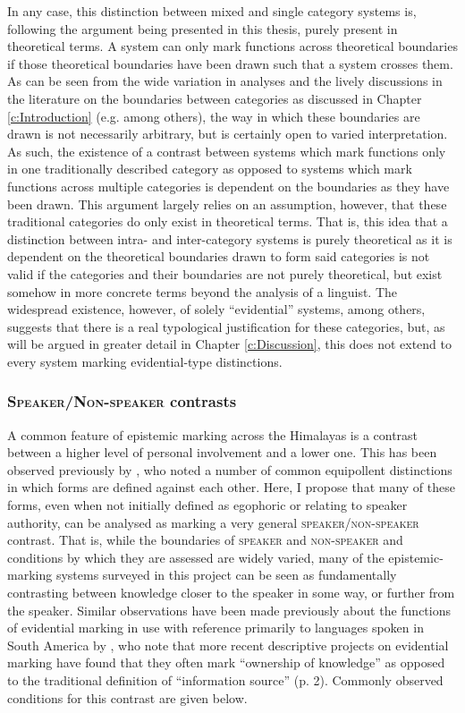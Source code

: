 In any case, this distinction between mixed and single category systems is, following the argument being presented in this thesis, purely present in theoretical terms. A system can only mark functions across theoretical boundaries if those theoretical boundaries have been drawn such that a system crosses them. As can be seen from the wide variation in analyses and the lively discussions in the literature on the boundaries between categories as discussed in Chapter \ref{c:Introduction} (e.g.  among others), the way in which these boundaries are drawn is not necessarily arbitrary, but is certainly open to varied interpretation. As such, the existence of a contrast between systems which mark functions only in one traditionally described category as opposed to systems which mark functions across multiple categories is dependent on the boundaries as they have been drawn. This argument largely relies on an assumption, however, that these traditional categories do only exist in theoretical terms. That is, this idea that a distinction between intra- and inter-category systems is purely theoretical as it is dependent on the theoretical boundaries drawn to form said categories is not valid if the categories and their boundaries are not purely theoretical, but exist somehow in more concrete terms beyond the analysis of a linguist. The widespread existence, however, of solely ``evidential'' systems, among others, suggests that there is a real typological justification for these categories, but, as will be argued in greater detail in Chapter \ref{c:Discussion}, this does not extend to every system marking evidential-type distinctions.

\subsubsection{\textsc{Speaker}/\textsc{Non-speaker} contrasts}\label{sss:Description:SpeakerNonSpeaker}

A common feature of epistemic marking across the Himalayas is a contrast between a higher level of personal involvement and a lower one. This has been observed previously by \cite{Zemp2021a}, who noted a number of common equipollent distinctions in which forms are defined against each other. Here, I propose that many of these forms, even when not initially defined as egophoric or relating to speaker authority, can be analysed as marking a very general \textsc{speaker}/\textsc{non-speaker} contrast. That is, while the boundaries of \textsc{speaker} and \textsc{non-speaker} and conditions by which they are assessed are widely varied, many of the epistemic-marking systems surveyed in this project can be seen as fundamentally contrasting between knowledge closer to the speaker in some way, or further from the speaker. Similar observations have been made previously about the functions of evidential marking in use with reference primarily to languages spoken in South America by , who note that more recent descriptive projects on evidential marking have found that they often mark ``ownership of knowledge'' as opposed to the traditional definition of ``information source'' (p. 2). Commonly observed conditions for this contrast are given below. 

